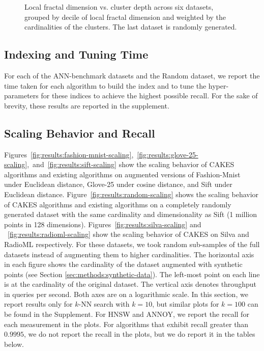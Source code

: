 \begin{figure}
\begin{subfigure}[b]{0.47\textwidth}
        \label{fig:results:silva-lfd}
    \end{subfigure}%
    \vspace{1em}
    \caption{Local fractal dimension vs. cluster depth across six datasets, grouped by decile of local fractal dimension and weighted by the cardinalities of the clusters.
    The last dataset is randomly generated.}
    \label{fig:results:lfd-plots}
\end{figure}


\subsection{Indexing and Tuning Time}
\label{sec:results:indexing-and-tuning-time}

For each of the ANN-benchmark datasets and the Random dataset, we report the time taken for each algorithm to build the index and to tune the hyper-parameters for these indices to achieve the highest possible recall. For the sake of brevity, these results are reported in the supplement.


\subsection{Scaling Behavior and Recall}
\label{sec:results:scaling-behavior-and-recall}

Figures~\ref{fig:results:fashion-mnist-scaling},~\ref{fig:results:glove-25-scaling},~and~\ref{fig:results:sift-scaling} show the scaling behavior of CAKES algorithms and existing algorithms on augmented versions of Fashion-Mnist under Euclidean distance,
Glove-25 under cosine distance, and
Sift under Euclidean distance.
Figure~\ref{fig:results:random-scaling} shows the scaling behavior of CAKES algorithms and existing algorithms on a completely randomly generated dataset with the same cardinality and dimensionality as Sift (1 million points in 128 dimensions).
Figures~\ref{fig:results:silva-scaling} and ~\ref{fig:results:radioml-scaling} show the scaling behavior of CAKES on Silva and RadioML respectively.
For these datasets, we took random sub-samples of the full datasets instead of augmenting them to higher cardinalities.
The horizontal axis in each figure shows the cardinality of the dataset augmented with synthetic points (see Section \ref{sec:methods:synthetic-data}).
The left-most point on each line is at the cardinality of the original dataset.
The vertical axis denotes throughput in queries per second.
Both axes are on a logarithmic scale.
In this section, we report results only for $k$-NN search with $k = 10$, but similar plots for $k = 100$ can be found in the Supplement.
For HNSW and ANNOY, we report the recall for each measurement in the plots. For algorithms that exhibit recall greater than $0.9995$, we do not report the recall in the plots, but we do report it in the tables below.

